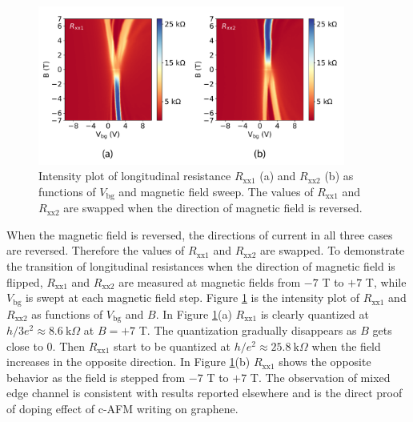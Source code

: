 \documentclass[pdflatex, sectionletters, 12pt]{pittetd}    %
\begin{document}
\begin{figure}[h!]
	\centering
	\includegraphics[width=0.90\textwidth]{Drawing/MixingIntensityPlot.pdf}
	\caption{Intensity plot of longitudinal resistance $R_\mathrm{xx1}$ (a) and $R_\mathrm{xx2}$ (b) as functions of $V_\mathrm{bg}$ and magnetic field sweep. The values of $R_\mathrm{xx1}$ and $R_\mathrm{xx2}$ are swapped when the direction of magnetic field is reversed.}
	\label{FIG:MixingIntensityPlot}
\end{figure}
 
When the magnetic field is reversed, the directions of current in all three cases are reversed. Therefore the values of $R_\mathrm{xx1}$ and $R_\mathrm{xx2}$ are swapped. To demonstrate the transition of longitudinal resistances when the direction of magnetic field is flipped, $R_\mathrm{xx1}$ and $R_\mathrm{xx2}$ are measured at magnetic fields from $-7$ T to $+7$ T, while $V_\mathrm{bg}$ is swept at each magnetic field step. Figure \ref{FIG:MixingIntensityPlot} is the intensity plot of $R_\mathrm{xx1}$ and $R_\mathrm{xx2}$ as functions of $V_\mathrm{bg}$ and $B$. In Figure \ref{FIG:MixingIntensityPlot}(a) $R_\mathrm{xx1}$ is clearly quantized at $h/3e^2 \approx 8.6 \ \mathrm{k}\Omega$ at $B = +7$ T. The quantization gradually disappears as $B$ gets close to 0. Then $R_\mathrm{xx1}$ start to be quantized at $h/e^2 \approx 25.8 \ \mathrm{k}\Omega$ when the field increases in the opposite direction. In Figure \ref{FIG:MixingIntensityPlot}(b) $R_\mathrm{xx1}$ shows the opposite behavior as the field is stepped from $-7$ T to $+7$ T. The observation of mixed edge channel is consistent with results reported elsewhere\cite{williams2007quantum, lohmann2009four, amet2014selective, abanin2007quantized, amet2014selective, ki2010dependence, klimov2015edge, woszczyna2011graphene, ozyilmaz2007electronic, schmidt2013mixing} and is the direct proof of doping effect of c-AFM writing on graphene.

\end{document}
